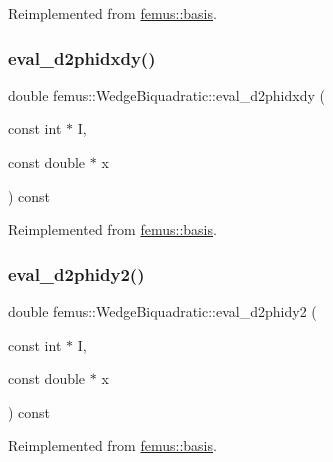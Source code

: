 Reimplemented from \mbox{\hyperlink{classfemus_1_1basis_a0a9839e75d1c9c8302486fc072eed028}{femus\+::basis}}.

\mbox{\label{classfemus_1_1_wedge_biquadratic_a640cd05846eea041705474ab453cb062}} 
\subsubsection{\texorpdfstring{eval\+\_\+d2phidxdy()}{eval\_d2phidxdy()}}
{\footnotesize\ttfamily double femus\+::\+Wedge\+Biquadratic\+::eval\+\_\+d2phidxdy (\begin{DoxyParamCaption}\item[{const int $\ast$}]{I,  }\item[{const double $\ast$}]{x }\end{DoxyParamCaption}) const\hspace{0.3cm}{\ttfamily [virtual]}}



Reimplemented from \mbox{\hyperlink{classfemus_1_1basis_ac9feaf9e60421143db2a3708f3c7fa48}{femus\+::basis}}.

\mbox{\label{classfemus_1_1_wedge_biquadratic_a76ec3516df27dd1e41d49fcbb652f750}} 
\subsubsection{\texorpdfstring{eval\+\_\+d2phidy2()}{eval\_d2phidy2()}}
{\footnotesize\ttfamily double femus\+::\+Wedge\+Biquadratic\+::eval\+\_\+d2phidy2 (\begin{DoxyParamCaption}\item[{const int $\ast$}]{I,  }\item[{const double $\ast$}]{x }\end{DoxyParamCaption}) const\hspace{0.3cm}{\ttfamily [virtual]}}



Reimplemented from \mbox{\hyperlink{classfemus_1_1basis_a0febb29fe4b32213ff8d6d428f7241cd}{femus\+::basis}}.

